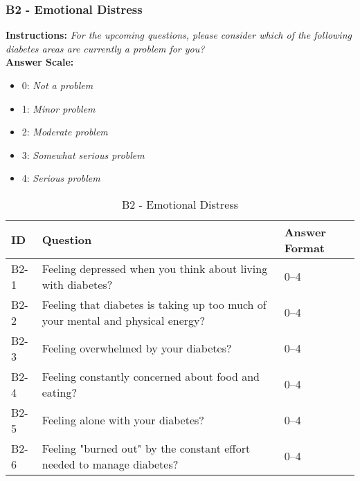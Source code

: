 \subsubsection{B2 - Emotional Distress}
\textbf{Instructions:} \emph{For the upcoming questions, please consider which of the following diabetes areas are currently a problem for you?}
\\
\textbf{Answer Scale:}
\begin{itemize}
    \item 0: \emph{Not a problem}
    \item 1: \emph{Minor problem}
    \item 2: \emph{Moderate problem}
    \item 3: \emph{Somewhat serious problem}
    \item 4: \emph{Serious problem}
\end{itemize}
\begin{table}[H]
    \centering
    \renewcommand{\arraystretch}{1.2}
    \begin{tabularx}{\textwidth}{|l|X|l|}
        \hline
        \textbf{ID} & \textbf{Question} & \textbf{Answer Format} \\ \hline
        B2-1 & Feeling depressed when you think about living with diabetes? & 0--4 \\ \hline
        B2-2 & Feeling that diabetes is taking up too much of your mental and physical energy? & 0--4 \\ \hline
        B2-3 & Feeling overwhelmed by your diabetes? & 0--4 \\ \hline
        B2-4 & Feeling constantly concerned about food and eating? & 0--4 \\ \hline
        B2-5 & Feeling alone with your diabetes? & 0--4 \\ \hline
        B2-6 & Feeling "burned out" by the constant effort needed to manage diabetes? & 0--4 \\ \hline
    \end{tabularx}
    \caption{B2 - Emotional Distress}
    \label{tab:emotional-distress}
\end{table}



